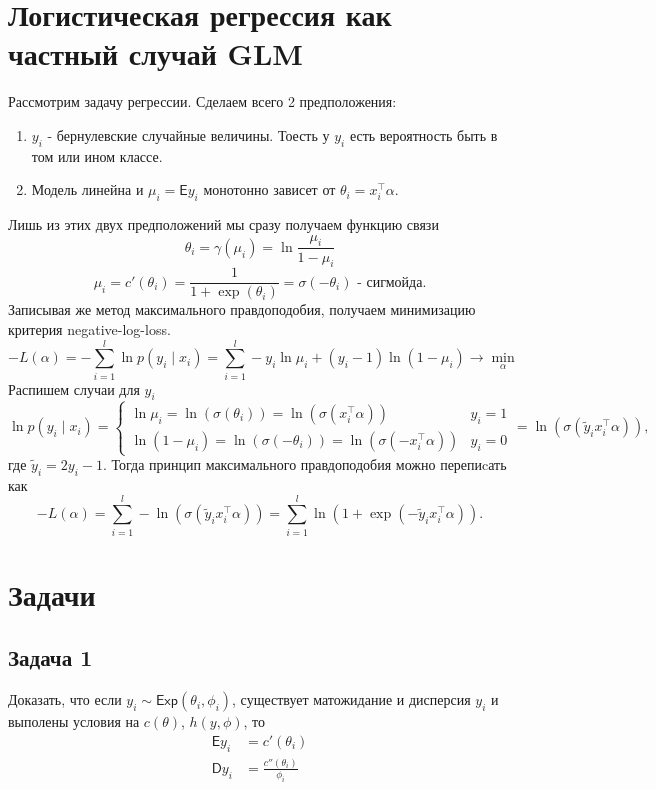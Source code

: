 \section*{Логистическая регрессия как частный случай GLM}
Рассмотрим задачу регрессии. Сделаем всего 2 предположения:
\begin{enumerate}
  \item $y_i$ - бернулевские случайные величины. Тоесть у $y_i$ есть вероятность быть в том или ином классе.
  \item Модель линейна и $\mu_i = \mathsf{E}y_i$ монотонно зависет от $\theta_i = x_i^\top\alpha$.
\end{enumerate}
Лишь из этих двух предположений мы сразу получаем функцию связи
$$
\theta_i = \gamma(\mu_i) = \ln\frac{\mu_i}{1-\mu_i}
$$
$$
\mu_i = c'(\theta_i) = \frac{1}{1+\exp(\theta_i)} = \sigma(-\theta_i) \text{ - сигмойда}.
$$
Записывая же метод максимального правдоподобия, получаем минимизацию критерия negative-log-loss.
$$
-L(\alpha) = -\sum_{i=1}^l \ln p(y_i \mid x_i) = \sum_{i=1}^l -y_i \ln \mu_i + (y_i - 1) \ln (1 - \mu_i) \to \min_\alpha
$$
Распишем случаи для $y_i$
$$
\ln p(y_i \mid x_i) = 
\begin{cases}
  \ln\mu_i = \ln(\sigma(\theta_i)) = \ln(\sigma(x_i^\top\alpha)) & y_i = 1\\
  \ln(1 - \mu_i) = \ln(\sigma(-\theta_i)) = \ln(\sigma(-x_i^\top\alpha)) & y_i = 0
\end{cases} = \ln(\sigma(\widetilde{y}_ix_i^\top\alpha)),
$$
где $\widetilde{y}_i = 2y_i - 1$. Тогда принцип максимального правдоподобия можно перепиcать как
$$
-L(\alpha) = \sum_{i=1}^l -\ln(\sigma(\widetilde{y}_ix_i^\top\alpha)) = 
\sum_{i=1}^l \ln(1 + \exp(-\widetilde{y}_ix_i^\top\alpha)).
$$

\section*{Задачи}

\subsection*{Задача 1}

Доказать, что если $y_i \sim \mathsf{Exp}(\theta_i, \phi_i)$, существует матожидание и дисперсия $y_i$ и выполены условия на $c(\theta)$, $h(y, \phi)$, то
\begin{align*}
  \mathsf{E}y_i &= c'(\theta_i)\\
  \mathsf{D}y_i &= \frac{c''(\theta_i)}{\phi_i}
\end{align*}

